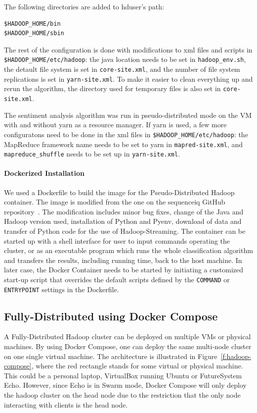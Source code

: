 The following directories are added to hduser's path:
\begin{verbatim}
$HADOOP_HOME/bin
$HADOOP_HOME/sbin
\end{verbatim}

The rest of the configuration is done with modifications to xml files
and scripts in \verb|$HADOOP_HOME/etc/hadoop|: the java location needs
to be set in \verb|hadoop_env.sh|, the detault file system is set
in \verb|core-site.xml|, and the number of file system replications is
set in \verb|yarn-site.xml|. To make it easier to clean everything up
and rerun the algorithm, the directory used for temporary files is
also set in \verb|core-site.xml|.

The sentiment analysis algorithm was run in pseudo-distributed mode on
the VM with and without yarn as a resource manager. If yarn is used, a
few more configuratons need to be done in the xml files
in \verb|$HADOOP_HOME/etc/hadoop|: the MapReduce framework name needs
to be set to yarn in \verb|mapred-site.xml|,
and \verb|mapreduce_shuffle| needs to be set up
in \verb|yarn-site.xml|.

\paragraph{Dockerized Installation} We used a Dockerfile to build the 
image for the Pseudo-Distributed Hadoop container. The image is
modified from the one on the sequenceiq GitHub
repository~\cite{hid-sp18-405-hadoop-sequenceiq}. The modification
includes minor bug fixes, change of the Java and Hadoop version used,
installation of Python and Pyenv, download of data and transfer of Python 
code for the use of Hadoop-Streaming. The container can be
started up with a shell interface for user to input commands operating
the cluster, or as an executable program which runs the whole
classification algorithm and transfers the results, including running
time, back to the host machine. In later case, the Docker Container
needs to be started by initiating a customized start-up script that
overrides the default scripts defined by the  \verb|COMMAND| or  
\verb|ENTRYPOINT|
settings in the Dockerfile.


\subsection{Fully-Distributed using Docker Compose}

A Fully-Distributed Hadoop cluster can be deployed on multiple VMs or
physical machines. By using Docker Compose, one can deploy the same
multi-node cluster on one single virtual machine.  The architecture is
illustrated in Figure~\ref{f:hadoop-compose}, where the red rectangle
stands for some virtual or physical machine. This could be a personal
laptop, VirtualBox running Ubuntu or FutureSystem Echo. However, since
Echo is in Swarm mode, Docker Compose will only deploy the hadoop
cluster on the head node due to the restriction that the only node
interacting with clients is the head node.

